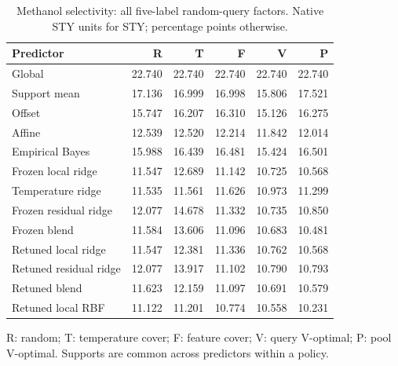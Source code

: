 \begin{table}[htbp]\centering\small
\caption{Methanol selectivity: all five-label random-query factors. Native STY units for STY; percentage points otherwise.}
\begin{tabular}{lrrrrr}\toprule Predictor & R & T & F & V & P\\\midrule
Global & 22.740 & 22.740 & 22.740 & 22.740 & 22.740\\
Support mean & 17.136 & 16.999 & 16.998 & 15.806 & 17.521\\
Offset & 15.747 & 16.207 & 16.310 & 15.126 & 16.275\\
Affine & 12.539 & 12.520 & 12.214 & 11.842 & 12.014\\
Empirical Bayes & 15.988 & 16.439 & 16.481 & 15.424 & 16.501\\
Frozen local ridge & 11.547 & 12.689 & 11.142 & 10.725 & 10.568\\
Temperature ridge & 11.535 & 11.561 & 11.626 & 10.973 & 11.299\\
Frozen residual ridge & 12.077 & 14.678 & 11.332 & 10.735 & 10.850\\
Frozen blend & 11.584 & 13.606 & 11.096 & 10.683 & 10.481\\
Retuned local ridge & 11.547 & 12.381 & 11.336 & 10.762 & 10.568\\
Retuned residual ridge & 12.077 & 13.917 & 11.102 & 10.790 & 10.793\\
Retuned blend & 11.623 & 12.159 & 11.097 & 10.691 & 10.579\\
Retuned local RBF & 11.122 & 11.201 & 10.774 & 10.558 & 10.231\\
\bottomrule\end{tabular}\par\smallskip\footnotesize R: random; T: temperature cover; F: feature cover; V: query V-optimal; P: pool V-optimal. Supports are common across predictors within a policy.\end{table}\FloatBarrier
